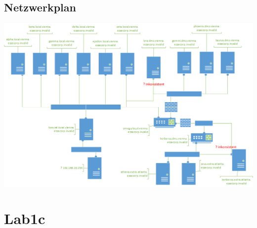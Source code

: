 \documentclass[12pt,a4paper,titlepage,oneside]{scrartcl}
\begin{document}
\subsection{Netzwerkplan}
\includegraphics[width=\textwidth]{./imgs/netzwerkplan.png}

\section{Lab1c} 
\end{document}
